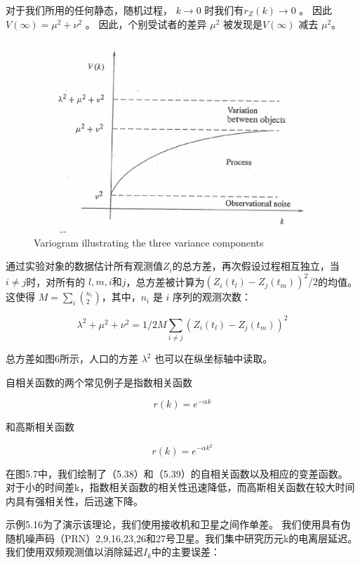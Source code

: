 对于我们所用的任何静态，随机过程， $ k\rightarrow 0 $ 时我们有$ r_{Z}(k)\rightarrow 0 $ 。 因此$ V(\infty)=\mu^{2}+\nu^{2} $ 。 因此，个别受试者的差异  $\mu^{2} $ 被发现是$ V(\infty) $ 减去 $ \mu^{2} $。
\begin{figure}[h]
	\centering
	\includegraphics[width=0.7\linewidth]{TeX_files/Part02/chapter05/image/10}
	\caption{Variogram illustrating the three variance components}
	\label{ }
\end{figure}

通过实验对象的数据估计所有观测值$ Z_{i} $的总方差，再次假设过程相互独立，当 $ i\neq j $时，对所有的 $ l ,m,i和j$，总方差被计算为$ (Z_{i}(t_{l})-Z_{j}(t_{m}))^{2}/2 $的均值。这使得  $ M=\sum\nolimits_{i}(_{2}^{n_{i}}) $，其中，$ n_{i} $ 是 $ i $ 序列的观测次数：

 \[ \lambda^{2}+\mu^{2}+\nu^{2}=1/2M \sum_{i\neq j}(Z_{i}(t_{l})-Z_{j}(t_{m}))^{2} \]
 
 总方差如图6所示，人口的方差 $ \lambda^{2} $ 也可以在纵坐标轴中读取。
 
 自相关函数的两个常见例子是指数相关函数
 
\begin{equation}\label{5.38}
r(k)=e^{-\alpha k}
\end{equation}

 和高斯相关函数
 
\begin{equation}\label{5.39}
r(k)=e^{-\alpha k^{2}}
\end{equation}

 
 在图5.7中，我们绘制了（5.38）和（5.39）的自相关函数以及相应的变差函数。 对于小的时间差k，指数相关函数的相关性迅速降低，而高斯相关函数在较大时间内具有强相关性，后迅速下降。
 
 示例5.16为了演示该理论，我们使用接收机和卫星之间作单差。 我们使用具有伪随机噪声码（PRN）2,9,16,23,26和27号卫星。我们集中研究历元k的电离层延迟。我们使用双频观测值以消除延迟$ I_ {k} $中的主要误差：
 
